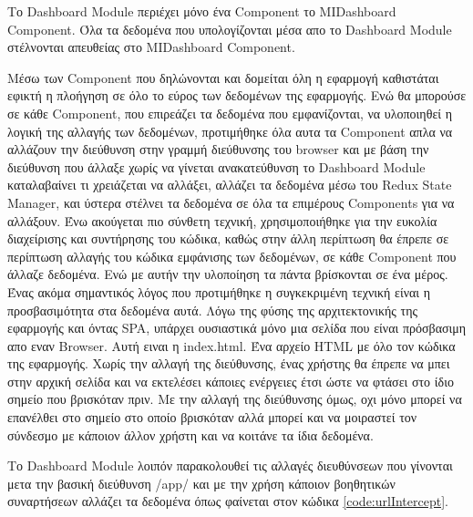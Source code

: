 Το Dashboard Module περιέχει μόνο ένα Component το ΜΙDashboard Component. Όλα τα δεδομένα που υπολογίζονται μέσα απο το Dashboard Module στέλνονται απευθείας στο ΜΙDashboard Component.

Μέσω των Component που δηλώνονται και δομείται όλη η εφαρμογή καθιστάται εφικτή η πλοήγηση σε όλο το εύρος των δεδομένων της εφαρμογής. Ενώ θα μπορούσε σε κάθε Component, που επιρεάζει τα δεδομένα που εμφανίζονται, να υλοποιηθεί η λογική της αλλαγής των δεδομένων, προτιμήθηκε όλα αυτα τα Component απλα να αλλάζουν την διεύθυνση στην γραμμή διεύθυνσης του browser και με βάση την διεύθυνση που άλλαξε χωρίς να γίνεται ανακατεύθυνση το Dashboard Module καταλαβαίνει τι χρειάζεται να αλλάξει, αλλάζει τα δεδομένα μέσω του Redux State Manager, και ύστερα στέλνει τα δεδομένα σε όλα τα επιμέρους Components για να αλλάξουν. Ένω ακούγεται πιο σύνθετη τεχνική, χρησιμοποιήθηκε για την ευκολία διαχείρισης και συντήρησης του κώδικα, καθώς στην άλλη περίπτωση θα έπρεπε σε περίπτωση αλλαγής του κώδικα εμφάνισης των δεδομένων, σε κάθε Component που άλλαζε δεδομένα. Ενώ με αυτήν την υλοποίηση τα πάντα βρίσκονται σε ένα μέρος. Ένας ακόμα σημαντικός λόγος που προτιμήθηκε η συγκεκριμένη τεχνική είναι η προσβασιμότητα στα δεδομένα αυτά. Λόγω της φύσης της αρχιτεκτονικής της εφαρμογής και όντας SPA, υπάρχει ουσιαστικά μόνο μια σελίδα που είναι πρόσβασιμη απο εναν Browser. Αυτή ειναι η index.html. Ένα αρχείο HTML με όλο τον κώδικα της εφαρμογής. Χωρίς την αλλαγή της διεύθυνσης, ένας χρήστης θα έπρεπε να μπει στην αρχική σελίδα και να εκτελέσει κάποιες ενέργειες έτσι ώστε να φτάσει στο ίδιο σημείο που βρισκόταν πριν. Με την αλλαγή της διεύθυνσης όμως, οχι μόνο μπορεί να επανέλθει στο σημείο στο οποίο βρισκόταν αλλά μπορεί και να μοιραστεί τον σύνδεσμο με κάποιον άλλον χρήστη και να κοιτάνε τα ίδια δεδομένα. 

Το Dashboard Module λοιπόν παρακολουθεί τις αλλαγές διευθύνσεων που γίνονται μετα την βασική διεύθυνση /app/ και με την χρήση κάποιον βοηθητικών συναρτήσεων αλλάζει τα δεδομένα όπως φαίνεται στον κώδικα \ref{code:urlIntercept}.

